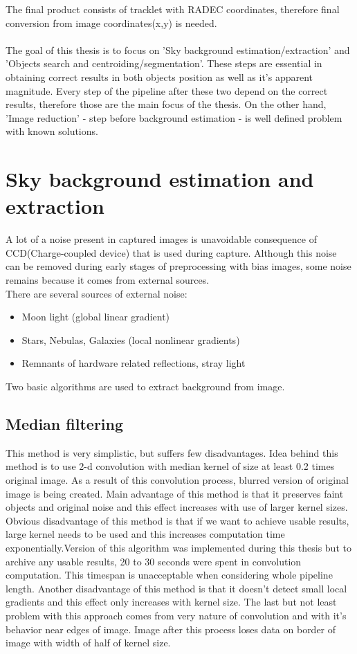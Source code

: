 \documentclass[12pt, a4paper, oneside]{book}
\begin{document}
\indent
The final product consists of tracklet with RADEC coordinates, therefore final conversion from image coordinates(x,y) is needed.\\
\\
The goal of this thesis is to focus on 'Sky background estimation/extraction' and 'Objects search and centroiding/segmentation'.
These steps are essential in obtaining correct results in both objects position as well as it's apparent magnitude.
Every step of the pipeline after these two depend on the correct results, therefore those are the main focus of the thesis.
On the other hand, 'Image reduction' - step before background estimation - is well defined problem with known solutions.

\section{Sky background estimation and extraction}
A lot of a noise present in captured images is unavoidable consequence of CCD(Charge-coupled device) that is used during capture. Although this noise can be removed during early stages of preprocessing with bias images, some noise remains because it comes from external sources.\\
There are several sources of external noise:
\begin{itemize}
    \item{Moon light (global linear gradient)}
    \item{Stars, Nebulas, Galaxies (local nonlinear gradients)}
    \item{Remnants of hardware related reflections, stray light}
\end{itemize}
Two basic algorithms are used to extract background from image.

\subsection{Median filtering}

This method is very simplistic, but suffers few disadvantages.
Idea behind this method is to use 2-d convolution with median kernel of size at least 0.2 times original image.
As a result of this convolution process, blurred version of original image is being created.
Main advantage of this method is that it preserves faint objects and original noise and this effect increases with use of larger kernel sizes.
Obvious disadvantage of this method is that if we want to achieve usable results, large kernel needs to be used and this increases computation time exponentially.Version of this algorithm was implemented during this thesis but to archive any usable results, 20 to 30 seconds were spent in convolution computation.
This timespan is unacceptable when considering whole pipeline length.
Another disadvantage of this method is that it doesn't detect small local gradients and this effect only increases with kernel size.
The last but not least problem with this approach comes from very nature of convolution and with it's behavior near edges of image.
Image after this process loses data on border of image with width of half of kernel size.
\end{document}
